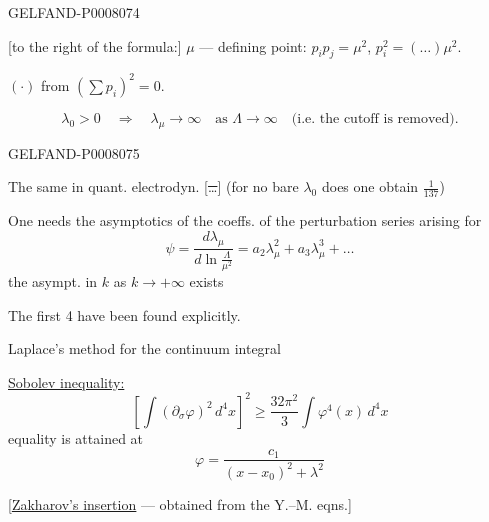 \begin{GelfandAdjacentEvidence}{GELFAND-P000807}{4}


[to the right of the formula:] \(\mu\) --- defining point: \(p_ip_j=\mu^2\), \(p_i^2=(\ldots)\mu^2\).

\((\cdot)\) from \((\sum p_i)^2=0\).

\[
\lambda_0>0\quad\Rightarrow\quad\lambda_\mu\longrightarrow\infty
\quad\text{as }\Lambda\longrightarrow\infty
\quad\text{(i.e. the cutoff is removed).}
\]
\end{GelfandAdjacentEvidence}
\begin{GelfandAdjacentEvidence}{GELFAND-P000807}{5}


The same in quant. electrodyn. [\sout{\ldots}]
(for no bare \(\lambda_0\) does one obtain \(\frac{1}{137}\))
\end{GelfandAdjacentEvidence}


One needs the asymptotics of the coeffs. of the perturbation series arising for
\[
\psi=\frac{d\lambda_\mu}{d\ln\frac{\Lambda}{\mu^2}}
=a_2\lambda_\mu^2+a_3\lambda_\mu^3+\ldots
\]
the asympt. in \(k\) as \(k\to+\infty\) exists

The first 4 have been found explicitly.

 Laplace’s method for the continuum integral

\uline{Sobolev inequality:}
\[
\left[\int(\partial_\sigma\varphi)^2\,d^4x\right]^2
\geq\frac{32\pi^2}{3}\int\varphi^4(x)\,d^4x
\]
equality is attained at
\[
\varphi=\frac{c_1}{(x-x_0)^2+\lambda^2}
\]

[\underline{\underline{Zakharov’s insertion}}\quad
{}
--- obtained from the Y.–M. eqns.]


